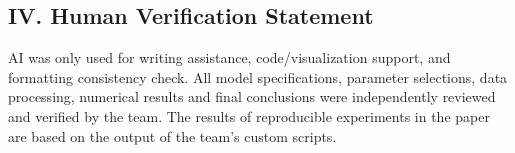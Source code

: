 \documentclass[12pt]{article}
\numberwithin{figure}{section}
\numberwithin{table}{section}
\begin{document}
	\subsection*{IV. Human Verification Statement}
	AI was only used for writing assistance, code/visualization support, and formatting consistency check. All model specifications, parameter selections, data processing, numerical results and final conclusions were independently reviewed and verified by the team. The results of reproducible experiments in the paper are based on the output of the team's custom scripts.
	
	\normalsize
	
	
\end{document}

